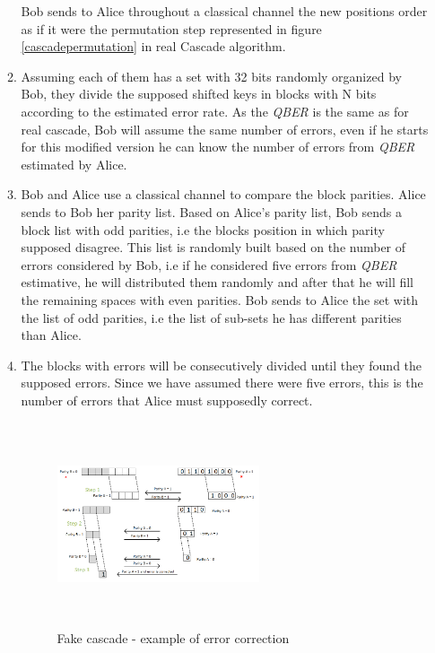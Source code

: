 \begin{enumerate}
\begin{enumerate}
            Bob sends to Alice throughout a classical channel the new positions order as if it were the permutation step represented in figure \ref{cascadepermutation} in real Cascade algorithm.

        \item Assuming each of them has a set with 32 bits randomly organized by Bob, they divide the supposed shifted keys in blocks with N bits according to the estimated error rate. As the \textit{QBER} is the same as for real cascade, Bob will assume the same number of errors, even if he starts for this modified version he can know the number of errors from \textit{QBER} estimated by Alice.

        \item Bob and Alice use a classical channel to compare the block parities. Alice sends to Bob her parity list. Based on Alice's parity list, Bob sends a block list with odd parities, i.e the blocks position in which parity supposed disagree. This list is randomly built based on the number of errors considered by Bob, i.e if he considered five errors from \textit{QBER} estimative, he will distributed them randomly and after that he will fill the remaining spaces with even parities. Bob sends to Alice the set with the list of odd parities, i.e the list of sub-sets he has different parities than Alice.

        \item The blocks with errors will be consecutively divided until they found the supposed errors. Since we have assumed there were five errors, this is the number of errors that Alice must supposedly correct.

            \begin{figure}[h]
            	\centering
            	\includegraphics[width=0.6\textwidth, height=6cm]{./sdf/ot_with_discrete_variables/figures/fake_cascade.png}
                	\caption{Fake cascade - example of error correction}\label{fake cascade}
            \end{figure}


\end{enumerate}
\end{enumerate}
